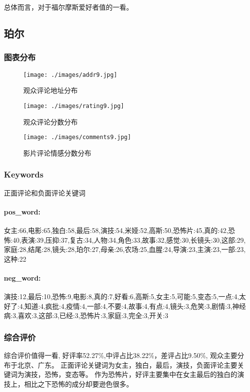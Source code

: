 \documentclass[12pt]{article}
\begin{document}
总体而言，对于福尔摩斯爱好者值的一看。

\subsection*{珀尔}
\subsubsection*{图表分布}
\begin{figure}[H]
    \centering
    \begin{minipage}[t]{0.48\textwidth}
    \centering
    \texttt{[image: ./images/addr9.jpg]}
    \caption{观众评论地址分布}
    \end{minipage}
    \begin{minipage}[t]{0.48\textwidth}
    \centering
    \texttt{[image: ./images/rating9.jpg]}
    \caption{观众评论分数分布}
    \end{minipage}
\end{figure}
\begin{figure}[H]
    \centering
    \texttt{[image: ./images/comments9.jpg]}
    \caption{影片评论情感分数分布} 
\end{figure} 
\subsubsection*{Keywords}
正面评论和负面评论关键词
\paragraph*{pos\_word:}
女主:66,电影:65,独白:58,最后:58,演技:54,米娅:52,高斯:50,恐怖片:45,真的:42,恐怖:40,表演:39,压抑:37,复古:34,人物:34,角色:33,故事:32,感觉:30,长镜头:30,这部:29,家庭:28,结尾:28,镜头:28,珀尔:27,母亲:26,农场:25,血腥:24,导演:23,主演:23,一部:23,这种:22
\paragraph*{neg\_word:}
演技:12,最后:10,恐怖:9,电影:8,真的:7,好看:6,高斯:5,女主:5,可能:5,变态:5,一点:4,太好了:4,知道:4,疯批:4,疫情:4,一部:4,不要:4,故事:4,有点:4,镜头:3,危笑:3,剧情:3,神经病:3,喜欢:3,这部:3,已经:3,恐怖片:3,家庭:3,完全:3,开关:3
\subsubsection*{综合评价}
综合评价值得一看, 好评率52.27\%,中评占比38.22\%，差评占比9.50\%, 
观众主要分布于北京、广东。
正面评论关键词为女主，独白，最后，演技，负面评论主要关键词为演技，恐怖，变态等。
作为恐怖片，好评主要集中在女主最后的独白的演技上，相比之下恐怖的成分却要逊色很多。
\end{document}
